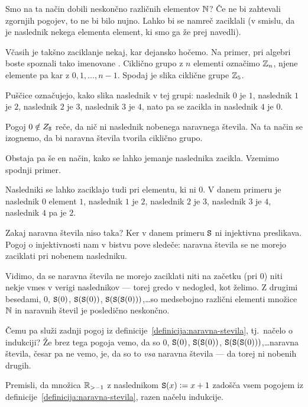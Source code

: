 Smo na ta način dobili neskončno različnih elementov $\mathbb{N}$? Če ne bi zahtevali zgornjih pogojev, to ne bi bilo nujno. Lahko bi se namreč zaciklali (v smislu, da je naslednik nekega elementa element, ki smo ga že prej navedli).

Včasih je takšno zaciklanje nekaj, kar dejansko hočemo. Na primer, pri algebri boste spoznali tako imenovane . Ciklično grupo z $n$ elementi označimo $\mathbb{Z}_n$, njene elemente pa kar z $0, 1, \ldots, n-1$. Spodaj je slika ciklične grupe $\mathbb{Z}_5$.


Puščice označujejo, kako slika naslednik v tej grupi: naslednik $0$ je $1$, naslednik $1$ je $2$, naslednik $2$ je $3$, naslednik $3$ je $4$, nato pa se zacikla in naslednik $4$ je $0$.

Pogoj $0 \notin Z_{\mathtt{S}}$ reče, da nič ni naslednik nobenega naravnega števila. Na ta način se izognemo, da bi naravna števila tvorila ciklično grupo.

Obstaja pa še en način, kako se lahko jemanje naslednika zacikla. Vzemimo spodnji primer.


Nasledniki se lahko zaciklajo tudi pri elementu, ki ni $0$. V danem primeru je naslednik $0$ element $1$, naslednik $1$ je $2$, naslednik $2$ je $3$, naslednik $3$ je $4$, naslednik $4$ pa je $2$.

Zakaj naravna števila niso taka? Ker v danem primeru $\mathtt{S}$ ni injektivna preslikava. Pogoj o injektivnosti nam v bistvu pove sledeče: naravna števila se ne morejo zaciklati pri nobenem nasledniku.

Vidimo, da se naravna števila ne morejo zaciklati niti na začetku (pri $0$) niti nekje vmes v verigi naslednikov --- torej gredo v nedogled, kot želimo. Z drugimi besedami, $0$, $\mathtt{S}(0)$, $\mathtt{S}(\mathtt{S}(0))$, $\mathtt{S}(\mathtt{S}(\mathtt{S}(0)))$,\ldots so medsebojno različni elementi množice $\mathbb{N}$ in naravnih števil je posledično neskončno.

Čemu pa služi zadnji pogoj iz definicije~\ref{definicija:naravna-stevila}, tj.~načelo o indukciji? Že brez tega pogoja vemo, da so $0$, $\mathtt{S}(0)$, $\mathtt{S}(\mathtt{S}(0))$, $\mathtt{S}(\mathtt{S}(\mathtt{S}(0)))$,\ldots naravna števila, česar pa ne vemo, je, da so to \emph{vsa} naravna števila --- da torej ni nobenih drugih.

\begin{naloga}
Premisli, da množica $\mathbb{R}_{> -1}$ z naslednikom $\mathtt{S}(x) \mathrel{\mathop:}= x+1$ zadošča vsem pogojem iz definicije~\ref{definicija:naravna-stevila}, razen načelu indukcije.
\end{naloga}

